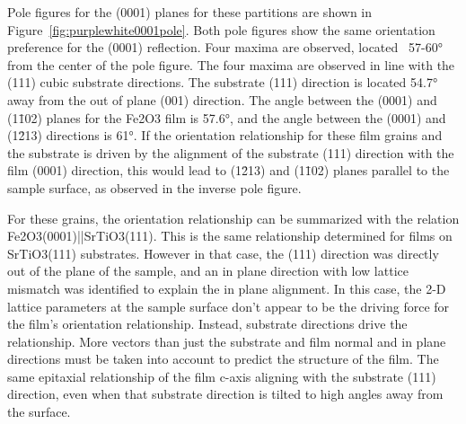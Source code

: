 \documentclass[12pt,%
              twoside,
               letterpaper]{uiothesis}
\begin{document}
Pole figures for the (0001) planes for these partitions are shown in
Figure~\ref{fig:purplewhite0001pole}. Both pole figures show the same orientation preference
for the (0001) reflection. Four maxima are observed, located ~57-60\si{\degree} from the
center of the pole figure. The four maxima are observed in line with the (111) cubic
substrate directions. The substrate (111) direction is located 54.7\si{\degree} away from
the out of plane (001) direction. The angle between the (0001) and (1\={1}02) planes for
the Fe2O3 film is 57.6\si{\degree}, and the angle between the (0001) and (1\={2}13)
directions is 61\si{\degree}. If the orientation relationship for these film grains and
the substrate is driven by the alignment of the substrate (111) direction with the film
(0001) direction, this would lead to (1\={2}13) and (1\={1}02) planes parallel to the
sample surface, as observed in the inverse pole figure. 

For these grains, the orientation relationship can be summarized with the relation
Fe2O3(0001)||SrTiO3(111).  This is the same relationship determined for films on
SrTiO3(111) substrates. However in that case, the (111) direction was directly out of
the plane of the sample, and an in plane direction with low lattice mismatch was
identified to explain the in plane alignment. In this case, the 2-D lattice parameters at
the sample surface don't appear to be the driving force for the film's orientation
relationship. Instead, substrate directions drive the relationship. More vectors than just
the substrate and film normal and in plane directions must be taken into account to
predict the structure of the film. The same epitaxial relationship of the film c-axis
aligning with the substrate (111) direction, even when that substrate direction is tilted
to high angles away from the surface.
\end{document}
